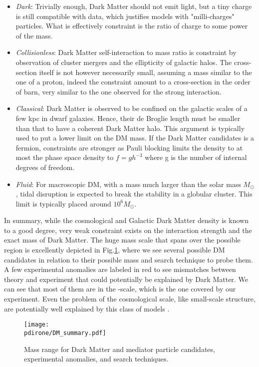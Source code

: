 \begin{itemize}
\item \textit{Dark}: Trivially enough, Dark Matter should not emit light, but a tiny charge is still compatible with data, which justifies models with "milli-charges" particles. What is effectively constraint is the ratio of charge to some power of the mass.
\item \textit{Collisionless}: Dark Matter self-interaction to mass ratio is constraint by observation of cluster mergers and the ellipticity of galactic halos. The cross-section itself is not however necessarily small, assuming a mass similar to the one of a proton, indeed the constraint amount to a cross-section in the order of barn, very similar to the one observed for the strong interaction.
\item \textit{Classical}: Dark Matter is observed to be confined on the galactic scales of a few kpc in dwarf galaxies. Hence, their de Broglie length must be smaller than that to have a coherent Dark Matter halo. This argument is typically used to put a lower limit on the DM mass. If the Dark Matter candidates is a fermion, constraints are stronger as Pauli blocking limits the density to at most the phase space density to $f=gh^{-3}$ where g is the number of internal degrees of freedom.
\item \textit{Fluid}: For macroscopic DM, with a mass much larger than the solar mass $M_{\odot}$, tidal disruption is expected to break the stability in a globular cluster. This limit is typically placed around $10^6 M_{\odot}$.
\end{itemize}

In summary, while the cosmological and Galactic Dark Matter density is known to a good degree, very weak constraint exists on the interaction strength and the exact mass of Dark Matter. The huge mass scale that spans over the possible region is excellently depicted in Fig.\ref{fig:dm-mass-range}, where we see several possible DM candidates in relation to their possible mass and search technique to probe them. A few experimental anomalies are labeled in red to see mismatches between theory and experiment that could potentially be explained by Dark Matter. We can see that most of them are in the \mev-\gev scale, which is the one covered by our experiment. Even the problem of the cosmological scale, like small-scale structure, are potentially well explained by this class of models \cite{battaglieri2017cosmic}.

\begin{figure}[bht!]
  \centering
  \texttt{[image: \\pdirone/DM\_summary.pdf]}
  \caption[Mass range for Dark Matter]{Mass range for Dark Matter and mediator particle candidates, experimental anomalies, and search techniques.}
  \label{fig:dm-mass-range}
\end{figure}

